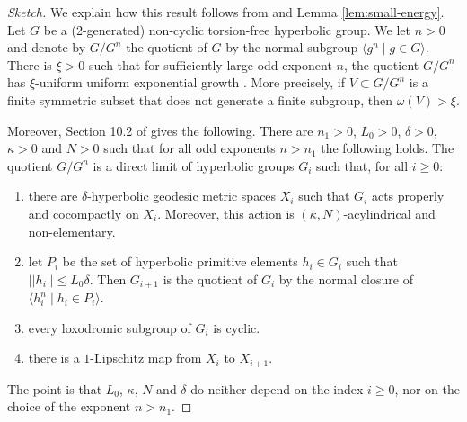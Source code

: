 \documentclass[leqno,a4paper,10pt]{amsart}
\theoremstyle{plain}
\theoremstyle{definition}
\theoremstyle{remark}
\begin{document}
 
 \begin{proof}[Sketch] We explain how this result follows from \cite{coulon_product_2022} and Lemma \ref{lem:small-energy}. Let $G$ be a (2-generated) non-cyclic torsion-free hyperbolic group. We let $n>0$ and denote by $G/G^n$ the quotient of $G$ by the normal subgroup $\langle g^n\mid  g\in G\rangle$. There is $\xi >0$ such that for sufficiently large odd exponent $n$, the quotient $G/G^n$ has $\xi$-uniform uniform exponential growth \cite[Corollary 1.3]{coulon_product_2022}. More precisely, if $V\subset G/G^n$ is a finite symmetric subset that does not generate a finite subgroup, then $\omega(V)>\xi$. 
 
 Moreover, Section 10.2 of \cite{coulon_product_2022} gives the following. There are $n_1>0$, $L_0>0$, $\delta>0$, $\kappa>0$ and $N>0$ such that for all odd exponents $n>n_1$ the following holds. The quotient $G/G^n$ is a direct limit of hyperbolic groups $G_i$ such that, for all $i\geqslant 0$: 
 \begin{enumerate}
 \item there are $\delta$-hyperbolic geodesic metric spaces $X_i$ such that $G_i$ acts properly and cocompactly on $X_i$. Moreover, this action is $(\kappa,N)$-acylindrical and non-elementary. 
 \item let $P_i$ be the set of hyperbolic primitive elements $h_i\in G_i$ such that $||h_i||\leqslant L_0\delta$. Then $G_{i+1}$ is the quotient of $G_i$ by the normal closure of $\langle h_i^n\mid h_i\in P_i\rangle$. 
 \item every loxodromic subgroup of $G_i$ is cyclic.  
 \item there is a $1$-Lipschitz map from $X_i$ to $X_{i+1}$. 
 \end{enumerate}
The point is that $L_0$, $\kappa$, $N$ and $\delta$ do neither depend on the index $i\geqslant 0$, nor on the choice of the exponent $n>n_1$.  
 

\end{proof}
\end{document}
